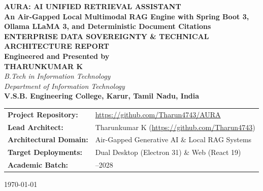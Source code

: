 \documentclass[12pt,a4paper]{report}
\begin{document}
\begin{titlepage}
    \centering
    \vspace*{0.8cm}
    
    {\Huge \textbf{AURA: AI UNIFIED RETRIEVAL ASSISTANT}}\\[0.3cm]
    {\LARGE \textbf{An Air-Gapped Local Multimodal RAG Engine with Spring Boot 3, Ollama LLaMA 3, and Deterministic Document Citations}}\\[1.2cm]
    
    {\large \textbf{ENTERPRISE DATA SOVEREIGNTY \& TECHNICAL ARCHITECTURE REPORT}}\\[1.0cm]
    
    \textbf{Engineered and Presented by}\\[0.3cm]
    {\Large \textbf{THARUNKUMAR K}}\\[0.2cm]
    \textit{B.Tech in Information Technology}\\[0.1cm]
    \textit{Department of Information Technology}\\[0.2cm]
    \textbf{V.S.B. Engineering College, Karur, Tamil Nadu, India}\\[1.5cm]
    
    \vfill
    
    \begin{tabular}{>{\raggedright\arraybackslash\bfseries}p{4.2cm}>{\raggedright\arraybackslash}p{10.2cm}}
        Project Repository: & \url{https://github.com/Tharun4743/AURA} \\
        Lead Architect: & Tharunkumar K (\url{https://github.com/Tharun4743}) \\
        Architectural Domain: & Air-Gapped Generative AI \& Local RAG Systems \\
        Target Deployments: & Dual Desktop (Electron 31) \& Web (React 19) \\
        Academic Batch: & 2024--2028 \\
    \end{tabular}
    
    \vspace*{0.8cm}
    {\small \today}
\end{titlepage}

\cleardoublepage
{}
\setcounter{page}{1}
\end{document}
